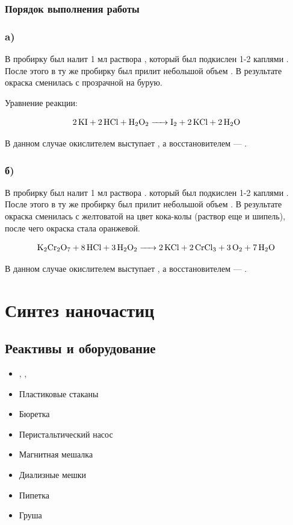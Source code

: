\documentclass[a4paper, 12pt]{article}
\begin{document}
\subsubsection{Порядок выполнения работы}

\subsubsection*{a)}

В пробирку был налит 1 мл раствора , который был подкислен 1-2 каплями . После этого в ту же пробирку был прилит небольшой объем . В результате окраска сменилась с прозрачной на бурую.

Уравнение реакции:

\begin{equation}
	\ce{2 KI + 2 HCl + H2O2 -> I2 + 2 KCl + 2H2O}
\end{equation}

В данном случае окислителем выступает , а восстановителем --- .

\subsubsection*{б)}

В пробирку был налит 1 мл раствора . который был подкислен 1-2 каплями . После этого в ту же пробирку был прилит небольшой объем . В результате окраска сменилась с желтоватой на цвет кока-колы (раствор еще и шипель), после чего окраска стала оранжевой.

\begin{equation}
	\ce{K2Cr2O7 + 8 HCl + 3 H2O2 -> 2KCl + 2CrCl3 + 3O2 + 7H2O}
\end{equation}

В данном случае окислителем выступает , а восстановителем --- .

\section{Синтез наночастиц }

\subsection{Реактивы и оборудование}

\begin{itemize}
	\item {}, , 
	
	\item Пластиковые стаканы
	\item Бюретка
	\item Перистальтический насос
	\item Магнитная мешалка
	\item Диализные мешки
	\item Пипетка
	\item Груша
\end{itemize}
\end{document}
